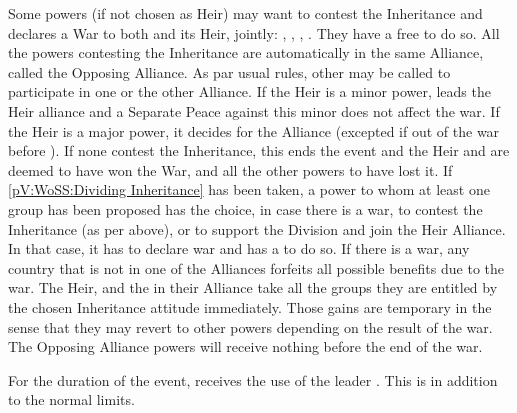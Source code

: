 \begin{digressions}



  \phdipl
  \aparag Some powers (if not chosen as Heir) may want to contest the
  Inheritance and declares a War to both \SPA and its Heir, jointly: \HOL,
  \FRA, \AUS, \ENG.
  \bparag They have a free \CB to do so.
  \bparag All the powers contesting the Inheritance are automatically in the
  same Alliance, called the Opposing Alliance.
  \bparag As par usual rules, other \MAJ may be called to participate in one
  or the other Alliance.
  \bparag If the Heir is a minor power, \SPA leads the Heir alliance and a
  Separate Peace against this minor does not affect the war.
  \bparag If the Heir is a major power, it decides for the Alliance (excepted
  if out of the war before \SPA).
  \aparag If none contest the Inheritance, this ends the event and the Heir
  and \SPA are deemed to have won the War, and all the other powers to have
  lost it.
  \aparag If \ref{pV:WoSS:Dividing Inheritance} has been taken, a power to
  whom at least one group has been proposed has the choice, in case there is a
  war, to contest the Inheritance (as per above), or to support the Division
  and join the Heir Alliance. In that case, it has to declare war and has a
  \CB to do so.
  \aparag If there is a war, any country that is not in one of the Alliances
  forfeits all possible benefits due to the war.
  \aparag The Heir, \SPA and the \MAJ in their Alliance take all the groups
  they are entitled by the chosen Inheritance attitude immediately. Those
  gains are temporary in the sense that they may revert to other powers
  depending on the result of the war. The Opposing Alliance powers will
  receive nothing before the end of the war.

  \phadm
  \aparag For the duration of the event, \ENG receives the use of the leader
  . This is in addition to the normal limits.




\end{digressions}
